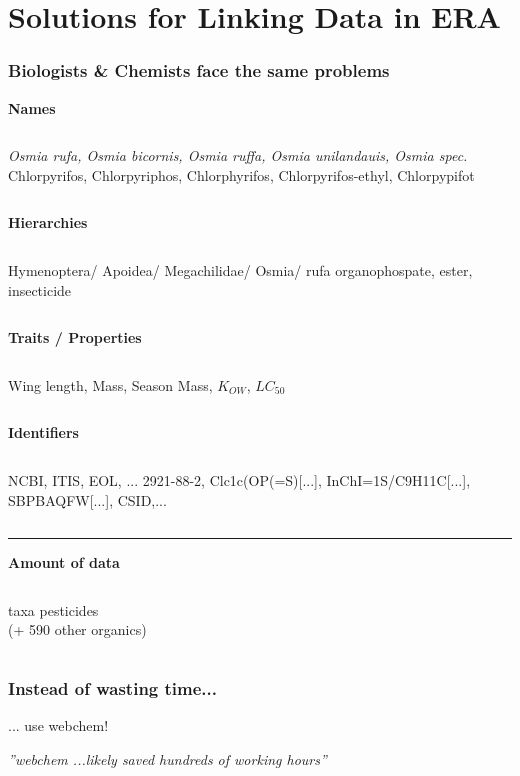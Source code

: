 \documentclass[10pt
	]{beamer}
\begin{document}
\section{Solutions for Linking Data in ERA}

\begin{frame}
\frametitle{Biologists \& Chemists face the same problems}
	\small
	\centering
	\textbf{\alert{Names}}
	\begin{columns}[t]
	\emph{Osmia rufa, Osmia bicornis, Osmia ruffa, Osmia unilandauis, Osmia spec.} 
	Chlorpyrifos, Chlorpyriphos, Chlorphyrifos, Chlorpyrifos-ethyl, Chlorpypifot
	\end{columns}
	\pause

	\centering
	\textbf{\alert{Hierarchies}}
	\begin{columns}[t]
	Hymenoptera/ Apoidea/ Megachilidae/ Osmia/ rufa 
	organophospate, ester, insecticide
	\end{columns}
	\pause

	\centering
	\textbf{\alert{Traits / Properties}}
	\begin{columns}[t]
	Wing length, Mass, Season 
	Mass, $K_{OW}$, $LC_{50}$
	\end{columns}
	\pause

	\centering
	\textbf{\alert{Identifiers}}
	\begin{columns}[t]
	NCBI, ITIS, EOL, ... 
	2921-88-2, Clc1c(OP(=S)[...], InChI=1S/C9H11C[...], SBPBAQFW[...], CSID,...
	\end{columns}
	\vspace{0.8em}
	\pause

	\rule{\textwidth}{1pt}
	\textbf{\alert{Amount of data}}

	\begin{columns}[t]
	 taxa
	 pesticides \\ (+ 590 other organics)
	\end{columns}
\end{frame}


{%
\begin{frame}{}
\frametitle{Instead of wasting time...}
... use \alert{webchem}! \\
	\hspace*{2cm}
	\begin{adjustbox}{max totalsize={\textwidth}{0.8\textheight}}
				
	\end{adjustbox}

\pause
\vspace*{-1cm}\emph{''\alert{webchem} ...likely saved hundreds of working hours''}
\end{frame}
}
\end{document}
